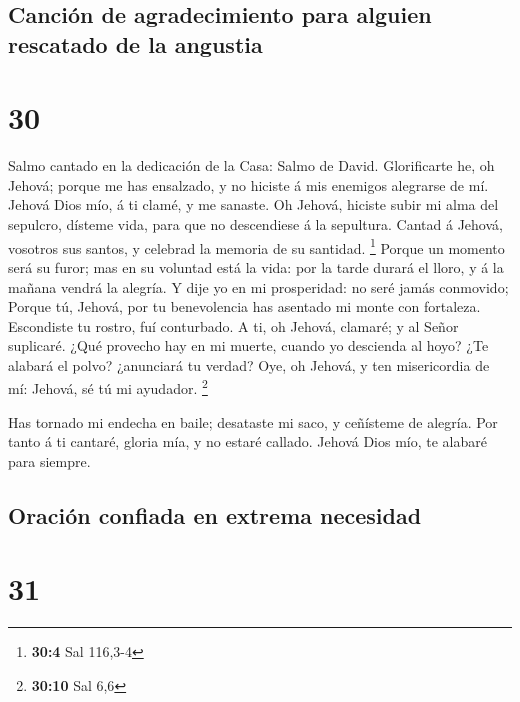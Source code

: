 \hypertarget{canciuxf3n-de-agradecimiento-para-alguien-rescatado-de-la-angustia}{%
\subsection{Canción de agradecimiento para alguien rescatado de la
angustia}\label{canciuxf3n-de-agradecimiento-para-alguien-rescatado-de-la-angustia}}

\hypertarget{section-29}{%
\section{30}\label{section-29}}

 Salmo cantado en la dedicación de la Casa: Salmo de David.
Glorificarte he, oh Jehová; porque me has ensalzado, y no hiciste á mis
enemigos alegrarse de mí.  Jehová Dios mío, á ti clamé, y me
sanaste.  Oh Jehová, hiciste subir mi alma del sepulcro,
dísteme vida, para que no descendiese á la sepultura. 
Cantad á Jehová, vosotros sus santos, y celebrad la memoria de su
santidad. \footnote{\textbf{30:4} Sal 116,3-4}  Porque un
momento será su furor; mas en su voluntad está la vida: por la tarde
durará el lloro, y á la mañana vendrá la alegría.  Y dije yo
en mi prosperidad: no seré jamás conmovido;  Porque tú,
Jehová, por tu benevolencia has asentado mi monte con fortaleza.
Escondiste tu rostro, fuí conturbado.  A ti, oh Jehová,
clamaré; y al Señor suplicaré.  ¿Qué provecho hay en mi
muerte, cuando yo descienda al hoyo? ¿Te alabará el polvo? ¿anunciará tu
verdad?  Oye, oh Jehová, y ten misericordia de mí: Jehová,
sé tú mi ayudador. \footnote{\textbf{30:10} Sal 6,6}

 Has tornado mi endecha en baile; desataste mi saco, y
ceñísteme de alegría.  Por tanto á ti cantaré, gloria mía,
y no estaré callado. Jehová Dios mío, te alabaré para siempre.

\hypertarget{oraciuxf3n-confiada-en-extrema-necesidad}{%
\subsection{Oración confiada en extrema
necesidad}\label{oraciuxf3n-confiada-en-extrema-necesidad}}

\hypertarget{section-30}{%
\section{31}\label{section-30}}

